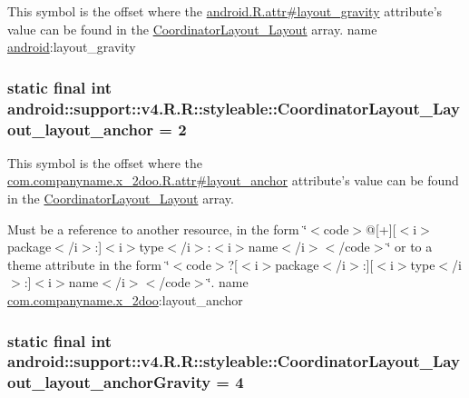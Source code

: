 This symbol is the offset where the \hyperlink{}{android.R.attr\#layout\_\-gravity} attribute's value can be found in the \hyperlink{classandroid_1_1support_1_1v4_1_1_r_1_1styleable_002d98b0482bfb71440db629b16e17bf}{CoordinatorLayout\_\-Layout} array.  name \hyperlink{namespaceandroid}{android}:layout\_\-gravity \hypertarget{classandroid_1_1support_1_1v4_1_1_r_1_1styleable_b35a32b00f117fac198051858264bb36}{
\subsubsection[{CoordinatorLayout\_\-Layout\_\-layout\_\-anchor}]{\setlength{\rightskip}{0pt plus 5cm}static final int android::support::v4.R.R::styleable::CoordinatorLayout\_\-Layout\_\-layout\_\-anchor = 2}}
\label{classandroid_1_1support_1_1v4_1_1_r_1_1styleable_b35a32b00f117fac198051858264bb36}


This symbol is the offset where the \hyperlink{classcom_1_1companyname_1_1x__2doo_1_1_r_1_1attr_8eb9d1dd9e5b3e4434376fe742103f27}{com.companyname.x\_\-2doo.R.attr\#layout\_\-anchor} attribute's value can be found in the \hyperlink{classandroid_1_1support_1_1v4_1_1_r_1_1styleable_002d98b0482bfb71440db629b16e17bf}{CoordinatorLayout\_\-Layout} array.

Must be a reference to another resource, in the form \char`\"{}$<$code$>$@\mbox{[}+\mbox{]}\mbox{[}$<$i$>$package$<$/i$>$:\mbox{]}$<$i$>$type$<$/i$>$:$<$i$>$name$<$/i$>$$<$/code$>$\char`\"{} or to a theme attribute in the form \char`\"{}$<$code$>$?\mbox{[}$<$i$>$package$<$/i$>$:\mbox{]}\mbox{[}$<$i$>$type$<$/i$>$:\mbox{]}$<$i$>$name$<$/i$>$$<$/code$>$\char`\"{}.  name \hyperlink{namespacecom_1_1companyname_1_1x__2doo}{com.companyname.x\_\-2doo}:layout\_\-anchor \hypertarget{classandroid_1_1support_1_1v4_1_1_r_1_1styleable_f6e5589929bcbc99b0bcbeb23e048b95}{
\subsubsection[{CoordinatorLayout\_\-Layout\_\-layout\_\-anchorGravity}]{\setlength{\rightskip}{0pt plus 5cm}static final int android::support::v4.R.R::styleable::CoordinatorLayout\_\-Layout\_\-layout\_\-anchorGravity = 4}}
\label{classandroid_1_1support_1_1v4_1_1_r_1_1styleable_f6e5589929bcbc99b0bcbeb23e048b95}



